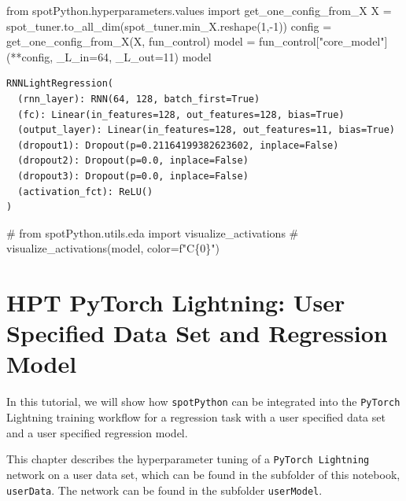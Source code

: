 \documentclass[
  letterpaper,
  DIV=11,
  numbers=noendperiod]{scrreprt}
\newenvironment{Shaded}{\begin{snugshade}}{\end{snugshade}}
\newcommand{\CommentTok}[1]{\textcolor[rgb]{0.37,0.37,0.37}{#1}}
\newcommand{\DecValTok}[1]{\textcolor[rgb]{0.68,0.00,0.00}{#1}}
\newcommand{\ImportTok}[1]{\textcolor[rgb]{0.00,0.46,0.62}{#1}}
\newcommand{\NormalTok}[1]{\textcolor[rgb]{0.00,0.23,0.31}{#1}}
\newcommand{\OperatorTok}[1]{\textcolor[rgb]{0.37,0.37,0.37}{#1}}
\newcommand{\StringTok}[1]{\textcolor[rgb]{0.13,0.47,0.30}{#1}}
\begin{document}
\begin{Shaded}
\begin{Highlighting}[]
\ImportTok{from}\NormalTok{ spotPython.hyperparameters.values }\ImportTok{import}\NormalTok{ get\_one\_config\_from\_X}
\NormalTok{X }\OperatorTok{=}\NormalTok{ spot\_tuner.to\_all\_dim(spot\_tuner.min\_X.reshape(}\DecValTok{1}\NormalTok{,}\OperatorTok{{-}}\DecValTok{1}\NormalTok{))}
\NormalTok{config }\OperatorTok{=}\NormalTok{ get\_one\_config\_from\_X(X, fun\_control)}
\NormalTok{model }\OperatorTok{=}\NormalTok{ fun\_control[}\StringTok{"core\_model"}\NormalTok{](}\OperatorTok{**}\NormalTok{config, \_L\_in}\OperatorTok{=}\DecValTok{64}\NormalTok{, \_L\_out}\OperatorTok{=}\DecValTok{11}\NormalTok{)}
\NormalTok{model}
\end{Highlighting}
\end{Shaded}

\begin{verbatim}
RNNLightRegression(
  (rnn_layer): RNN(64, 128, batch_first=True)
  (fc): Linear(in_features=128, out_features=128, bias=True)
  (output_layer): Linear(in_features=128, out_features=11, bias=True)
  (dropout1): Dropout(p=0.21164199382623602, inplace=False)
  (dropout2): Dropout(p=0.0, inplace=False)
  (dropout3): Dropout(p=0.0, inplace=False)
  (activation_fct): ReLU()
)
\end{verbatim}

\begin{Shaded}
\begin{Highlighting}[]
\CommentTok{\# from spotPython.utils.eda import visualize\_activations}
\CommentTok{\# visualize\_activations(model, color=f"C\{0\}")}
\end{Highlighting}
\end{Shaded}

\chapter{HPT PyTorch Lightning: User Specified Data Set and Regression
Model}\label{hpt-pytorch-lightning-user-specified-data-set-and-regression-model}

In this tutorial, we will show how \texttt{spotPython} can be integrated
into the \texttt{PyTorch} Lightning training workflow for a regression
task with a user specified data set and a user specified regression
model.

This chapter describes the hyperparameter tuning of a
\texttt{PyTorch\ Lightning} network on a user data set, which can be
found in the subfolder of this notebook, \texttt{userData}. The network
can be found in the subfolder \texttt{userModel}.
\end{document}
